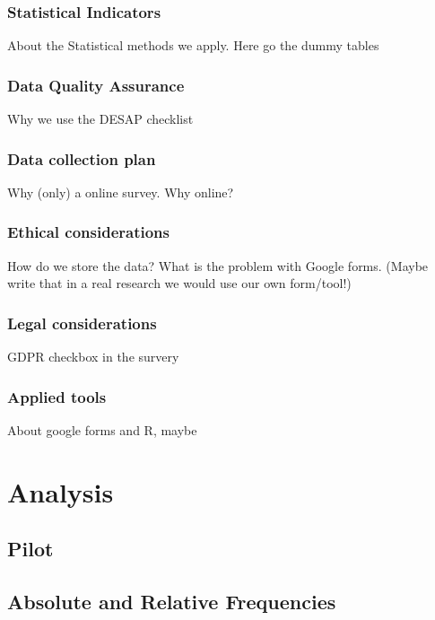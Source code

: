 \documentclass[12pt,a4paper,paper=a4,oneside,titlepage,pdftex]{scrartcl}
\begin{document}
\subsubsection{Statistical Indicators}
About the Statistical methods we apply. Here go the dummy tables

\subsubsection{Data Quality Assurance}
Why we use the DESAP checklist

\subsubsection{Data collection plan}
Why (only) a online survey. Why online?


\subsubsection{Ethical considerations}
How do we store the data? What is the problem with Google forms. (Maybe write that in a real research we would use our own form/tool!)

\subsubsection{Legal considerations}
GDPR checkbox in the survery

\subsubsection{Applied tools}
About google forms and R, maybe

\section{Analysis}

\subsection{Pilot}

\subsection{Absolute and Relative Frequencies}
\end{document}
